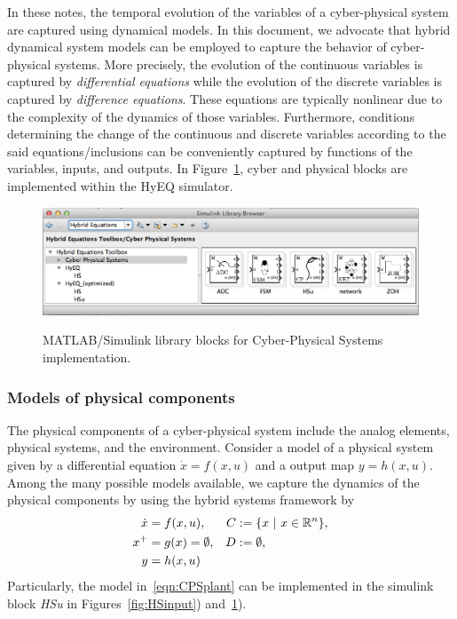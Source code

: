 \documentclass{article}
\begin{document}
In these notes, the temporal evolution of the variables of a cyber-physical system
are captured using dynamical models.
In this document, we advocate that hybrid dynamical system models
can be employed to capture the behavior of cyber-physical systems.
More precisely, the evolution of the continuous variables is captured by 
{\em differential equations}
while the evolution of the discrete variables is captured by
{\em difference equations}.
These equations are typically nonlinear
due to the complexity of the dynamics of those variables.
Furthermore, conditions determining the change of 
the continuous and discrete variables according to the said
equations/inclusions can be conveniently captured by functions of the
variables, inputs, and outputs.  
In Figure~\ref{fig:CPS}, cyber and physical blocks are implemented within the HyEQ simulator.

\begin{figure}[ht]
  \begin{center}
    {\includegraphics[width=1.0\textwidth]{figures/Simulink/SimulinkimplementationCPS_Mac.eps}}
\caption{MATLAB/Simulink library blocks for Cyber-Physical Systems implementation.}
\label{fig:CPS}
  \end{center}
\end{figure}

\subsubsection{Models of physical components}
\label{sec:PhysicalModels}

The physical components of a cyber-physical system include the analog elements, physical systems, and the environment. 
Consider a model of a physical system given by a differential equation $\dot{x} = f(x,u)$ and a output map $y = h(x,u)$. Among the many possible models available, we capture the dynamics of the physical components
by using the hybrid systems framework by
\begin{subequations}\label{eqn:CPSplant}
\begin{align}
\dot{x} &= f(x,u), 
&C &:= \{ x\ |\ x \in {\mathbb R}^{n}\},\\
x^+ &= g(x) =\emptyset,
&D &:= \emptyset,\\
y &= h(x,u)
\end{align}
\end{subequations}
Particularly, the model in~\eqref{eqn:CPSplant} can be implemented in the simulink block {\em HSu} in Figures~\ref{fig:HSinput}) and~\ref{fig:CPS}).
\end{document}
